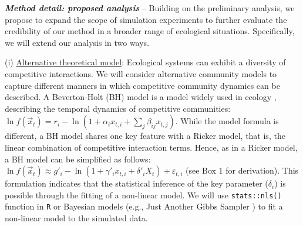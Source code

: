 \documentclass[12pt, class=article, crop=false]{standalone}
\begin{document}
\textbf{\textit{Method detail: proposed analysis}} -- 
Building on the preliminary analysis, we propose to expand the scope of simulation experiments to further evaluate the credibility of our method in a broader range of ecological situations.
Specifically, we will extend our analysis in two ways.

(i) \ul{Alternative theoretical model}:
Ecological systems can exhibit a diversity of competitive interactions.
We will consider alternative community models to capture different manners in which competitive community dynamics can be described. 
A Beverton-Holt (BH) model is a model widely used in ecology \citep{otto_biologists_2011}, describing the temporal dynamics of competitive communities: $\ln f(\overset{\rightarrow}{x}_{t}) = r_i - \ln(1 + \alpha_i x_{t,i} + \sum_j \beta_{ij} x_{t,j})$. 
While the model formula is different, a BH model shares one key feature with a Ricker model, that is, the linear combination of competitive interaction terms.
Hence, as in a Ricker model, a BH model can be simplified as follows: $\ln f(\overset{\rightarrow}{x}_{t}) \approx g'_{i} - \ln(1 + \gamma'_i x_{t,i} + \delta'_i X_t) + \varepsilon_{t,i}$ (see Box 1 for derivation).
This formulation indicates that the statistical inference of the key parameter ($\delta_i$) is possible through the fitting of a non-linear model.
We will use \texttt{stats::nls()} function in \texttt{R} or Bayesian models (e.g., Just Another Gibbs Sampler \citep{plummer_jags_2003}) to fit a non-linear model to the simulated data.
\end{document}
